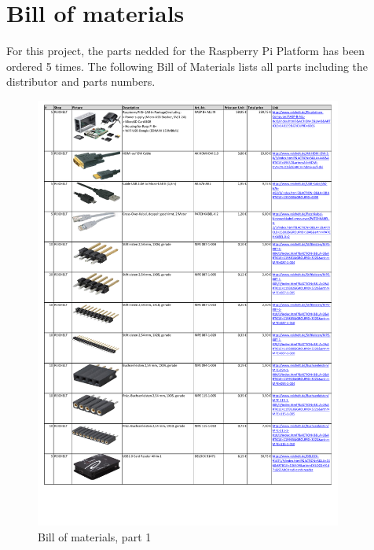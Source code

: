 \newpage
\section{Bill of materials}
\label{sec:hardware:BillOfMat}

For this project, the parts nedded for the Raspberry Pi Platform has been ordered 5 times. The following Bill of Materials lists all parts including the distributor and parts numbers.

\begin{figure}[H]
    \centering
    \includegraphics[width=0.90\textwidth,trim=0 80 0 8,clip=true]{fig/ch-rpi-hardware/1_Masterquad2015_BoM}
    \caption{Bill of materials, part 1}
    \label{fig:hardware:BillOfMat:1}
\end{figure}

